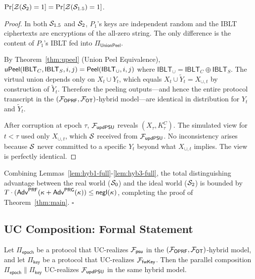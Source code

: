 \begin{lemma}\label{lem:hyb3-full}
$\Pr[\mathcal{Z}(\mathcal{S}_2)=1] = \Pr[\mathcal{Z}(\mathcal{S}_{1.5})=1]$.
\end{lemma}

\begin{proof}
In both $\mathcal{S}_{1.5}$ and $\mathcal{S}_2$, $P_1$'s keys are independent random and
the IBLT ciphertexts are encryptions of the all-zero string. The only
difference is the content of $P_1$'s IBLT fed into
$\Pi_{\mathsf{UnionPeel}}$.

By Theorem~\ref{thm:upeel} (Union Peel Equivalence),
$\mathsf{uPeel}(\mathsf{IBLT}_C, \mathsf{IBLT}_S, i, j) =
\mathsf{Peel}(\mathsf{IBLT}_\cup, i, j)$ where $\mathsf{IBLT}_\cup =
\mathsf{IBLT}_C \oplus \mathsf{IBLT}_S$. The virtual union depends only
on $X_t \cup Y_t$, which equals $X_t \cup \tilde{Y}_t = X_{\cup,t}$ by
construction of $\tilde{Y}_t$. Therefore the peeling outputs---and hence
the entire protocol transcript in the
$(\mathcal{F}_{\mathsf{OPRF}}, \mathcal{F}_{\mathsf{OT}})$-hybrid model---are identical
in distribution for $Y_t$ and $\tilde{Y}_t$.

After corruption at epoch $\tau$, $\mathcal{F}_{\mathsf{updPSU}}$ reveals
$(X_\tau, K^C_\tau)$. The simulated view for $t < \tau$ used only
$X_{\cup,t}$, which $\mathcal{S}$ received from $\mathcal{F}_{\mathsf{updPSU}}$. No
inconsistency arises because $\mathcal{S}$ never committed to a specific $Y_t$
beyond what $X_{\cup,t}$ implies. The view is perfectly identical.
\end{proof}

Combining Lemmas~\ref{lem:hyb1-full}-\ref{lem:hyb3-full}, the total
distinguishing advantage between the real world ($\mathcal{S}_0$) and the ideal
world ($\mathcal{S}_2$) is bounded by $T \cdot (\mathsf{Adv}^{\mathsf{PRF}}(\kappa
+ \mathsf{Adv}^{\mathsf{PRG}}(\kappa)) \leq \mathsf{negl}(\kappa)$, completing the
proof of Theorem~\ref{thm:main}. \hfill$\square$

\subsection{UC Composition: Formal Statement}

\begin{theorem}[UC Composition]\label{thm:composition}
Let $\Pi_{\mathsf{epoch}}$ be a protocol that UC-realizes $\mathcal{F}_{\mathsf{psu}}$
in the $(\mathcal{F}_{\mathsf{OPRF}}, \mathcal{F}_{\mathsf{OT}})$-hybrid model, and let
$\Pi_{\mathsf{key}}$ be a protocol that UC-realizes $\mathcal{F}_{\mathsf{fwKey}}$.
Then the parallel composition $\Pi_{\mathsf{epoch}} \parallel
\Pi_{\mathsf{key}}$ UC-realizes $\mathcal{F}_{\mathsf{updPSU}}$ in the same hybrid
model.
\end{theorem}

